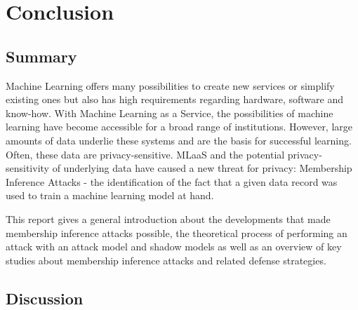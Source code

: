 \documentclass[runningheads]{llncs}
\begin{document}
\section{Conclusion}
\subsection{Summary}

Machine Learning offers many possibilities to create new services or simplify existing ones but also has high requirements regarding hardware, software and know-how. With Machine Learning as a Service, the possibilities of machine learning have become accessible for a broad range of institutions. However, large amounts of data underlie these systems and are the basis for successful learning. Often, these data are privacy-sensitive. MLaaS and the potential privacy-sensitivity of underlying data have caused a new threat for privacy: Membership Inference Attacks - the identification of the fact that a given data record was used to train a machine learning model at hand.
\par
This report gives a general introduction about the developments that made membership inference attacks possible, the theoretical process of performing an attack with an attack model and shadow models as well as an overview of key studies about membership inference attacks and related defense strategies.

\subsection{Discussion}
\end{document}
